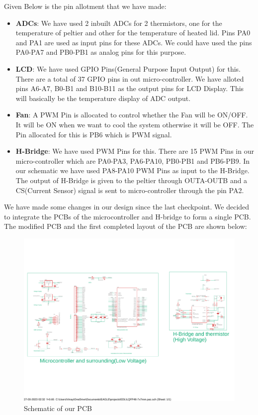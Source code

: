 \documentclass{article}
\begin{document}
Given Below is the pin allotment that we have made:\\
\begin{itemize}
    \item \textbf{ADCs}: We have used 2 inbuilt ADCs for 2 thermistors, one for the temperature of peltier and other for the temperature of heated lid. Pins PA0 and PA1 are used as input pins for these ADCs. We could have used the pins PA0-PA7 and PB0-PB1 as analog pins for this purpose.

    \item \textbf{LCD}: We have used GPIO Pins(General Purpose Input Output) for this. There are a total of 37 GPIO pins in out micro-controller. We have alloted pins A6-A7, B0-B1 and B10-B11 as the output pins for LCD Display. This will basically be the temperature display of ADC output.

    \item \textbf{Fan}: A PWM Pin is allocated to control whether the Fan will be ON/OFF. It will be ON when we want to cool the system otherwise it will be OFF. The Pin allocated for this is PB6 which is PWM signal.

    \item \textbf{H-Bridge}: We have used PWM Pins for this. There are 15 PWM Pins in our micro-controller which are PA0-PA3, PA6-PA10, PB0-PB1 and PB6-PB9. In our schematic we have used PA8-PA10 PWM Pins as input to the H-Bridge. The output of H-Bridge is given to the peltier through OUTA-OUTB and a CS(Current Sensor) signal is sent to micro-controller through the pin PA2. 
\end{itemize}

We have made some changes in our design since the last checkpoint. We decided to integrate the PCBs of the microcontroller and H-bridge to form a single PCB. The modified PCB and the first completed layout of the PCB are shown below:

\begin{figure}[htp]
    \centering
    \includegraphics[width=\textwidth]{Images/ourpcbschematic.pdf}
    \caption{Schematic of our PCB}
    \label{fig:galaxy}
\end{figure}
\end{document}
